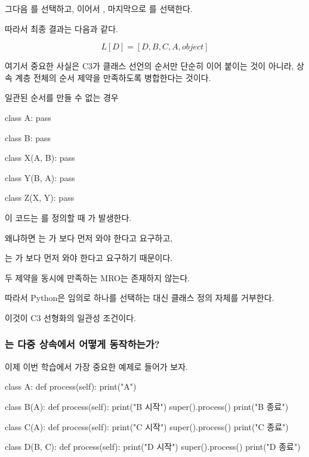 그다음 를 선택하고, 이어서 , 마지막으로 를 선택한다.

따라서 최종 결과는 다음과 같다.

\[
\boxed{
L[D] = [D,B,C,A,object]
}
\]

여기서 중요한 사실은 C3가 클래스 선언의 순서만 단순히 이어 붙이는 것이 아니라, 상속 계층 전체의 순서 제약을 만족하도록 병합한다는 것이다.

\begin{dhknote}
\begin{dhksmry}[centered]
일관된 순서를 만들 수 없는 경우
\end{dhksmry}
\end{dhknote}

\begin{dhkcode}
class A:
    pass

class B:
    pass

class X(A, B):
    pass

class Y(B, A):
    pass

class Z(X, Y):
    pass
\end{dhkcode}

이 코드는 를 정의할 때 가 발생한다.

왜냐하면 는 가 보다 먼저 와야 한다고 요구하고,

는 가 보다 먼저 와야 한다고 요구하기 때문이다.

두 제약을 동시에 만족하는 MRO는 존재하지 않는다.

따라서 Python은 임의로 하나를 선택하는 대신 클래스 정의 자체를 거부한다.

이것이 C3 선형화의 일관성 조건이다.

\subsubsection{는 다중 상속에서 어떻게 동작하는가?}

이제 이번 학습에서 가장 중요한 예제로 들어가 보자.

\begin{dhkcode}
class A:
    def process(self):
        print("A")


class B(A):
    def process(self):
        print("B 시작")
        super().process()
        print("B 종료")


class C(A):
    def process(self):
        print("C 시작")
        super().process()
        print("C 종료")


class D(B, C):
    def process(self):
        print("D 시작")
        super().process()
        print("D 종료")
\end{dhkcode}

